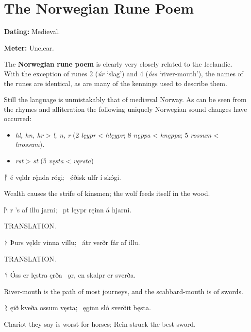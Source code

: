 \section{The Norwegian Rune Poem}\chapterStart{}

\begin{flushright}%
\textbf{Dating:} Medieval.%

\textbf{Meter:} Unclear.
\end{flushright}%

The \textbf{Norwegian rune poem} is clearly very closely related to the Icelandic.  With the exception of runes 2 (\emph{úr} ‘slag’) and 4 (\emph{óss} ‘river-mouth’), the names of the runes are identical, as are many of the kennings used to describe them.

Still the language is unmistakably that of mediæval Norway.  As can be seen from the rhymes and alliteration the following uniquely Norwegian sound changes have occurred:
\begin{itemize}
  \item \emph{hl, hn, hr} > \emph{l, n, r} (2 \emph{lęypr} < \emph{hlęypr}; 8 \emph{nęppa} < \emph{hnęppa}; 5 \emph{rossum} < \emph{hrossum}).
  \item \emph{rst} > \emph{st} (5 \emph{vęsta} < \emph{vęrsta})
\end{itemize}

\sectionline

\bvg\bva%
ᚠ é vęldr rę́nda rógi; \hld\ ǿðisk ulfr í skógi.\eva

\bvb Wealth causes the strife of kinsmen; the wolf feeds itself in the wood.\evb\evg


\bvg\bva%
ᚢ r ’s af illu jarni; \hld\ pt lęypr ręinn á hjarni.\eva

\bvb TRANSLATION.\evb\evg


\bvg\bva%
ᚦ Þurs vęldr vinna villu; \hld\ átr verðr fár af illu.\eva

\bvb TRANSLATION.\evb\evg


\bvg\bva%
ᚬ Óss er lęstra ęrða \hld\ ǫr, en skalpr er sverða.\eva

\bvb River-mouth is the path of most journeys, and the scabbard-mouth is of swords.\evb\evg


\bvg\bva%
ᚱ ęið kveða ossum vęsta; \hld\ ęginn sló sverðit bęsta.\eva

\bvb Chariot they say is worst for horses; Rein struck the best sword.\evb\evg


